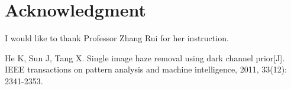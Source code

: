 \documentclass[journal,comsoc]{IEEEtran}
\begin{document}
\section*{Acknowledgment}
I would like to thank Professor Zhang Rui for her instruction.

\begin{thebibliography}{1}
  He K, Sun J, Tang X. Single image haze removal using dark channel prior[J].
  IEEE transactions on pattern analysis and machine intelligence, 2011, 33(12): 2341-2353.
\end{thebibliography}



\vfill
\end{document}
